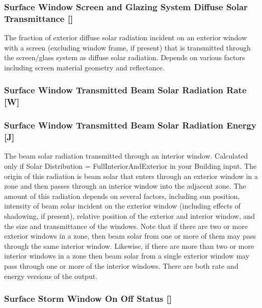\subsubsection{Surface Window Screen and Glazing System Diffuse Solar Transmittance {[]}}\label{surface-window-screen-and-glazing-system-diffuse-solar-transmittance}

The fraction of exterior diffuse solar radiation incident on an exterior window with a screen (excluding window frame, if present) that is transmitted through the screen/glass system as diffuse solar radiation. Depends on various factors including screen material geometry and reflectance.

\subsubsection{Surface Window Transmitted Beam Solar Radiation Rate {[}W{]}}\label{surface-window-transmitted-beam-solar-radiation-rate-w-1}

\subsubsection{Surface Window Transmitted Beam Solar Radiation Energy {[}J{]}}\label{surface-window-transmitted-beam-solar-radiation-energy-j-1}

The beam solar radiation transmitted through an interior window. Calculated only if Solar Distribution = FullInteriorAndExterior in your Building input. The origin of this radiation is beam solar that enters through an exterior window in a zone and then passes through an interior window into the adjacent zone. The amount of this radiation depends on several factors, including sun position, intensity of beam solar incident on the exterior window (including effects of shadowing, if present), relative position of the exterior and interior window, and the size and transmittance of the windows. Note that if there are two or more exterior windows in a zone, then beam solar from one or more of them may pass through the same interior window. Likewise, if there are more than two or more interior windows in a zone then beam solar from a single exterior window may pass through one or more of the interior windows. There are both rate and energy versions of the output.

\subsubsection{Surface Storm Window On Off Status {[]}}\label{surface-storm-window-on-off-status}

